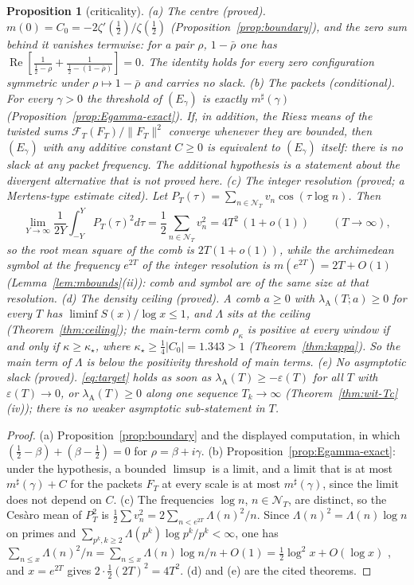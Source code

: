 \documentclass[11pt]{amsart}
\newtheorem{proposition}[theorem]{Proposition}
\theoremstyle{definition}
\theoremstyle{remark}
\newcommand{\Rel}{\operatorname{Re}}
\newcommand{\lamA}{\lambda_{\mathrm A}(T)}
\newcommand{\NT}{\mathcal N_T}
\begin{document}
\begin{proposition}[criticality]\label{prop:shape-crit}
\emph{(a) The centre (proved).} $m(0)=C_0=-2\zeta'(\frac12)/\zeta(\frac12)$ (Proposition~\ref{prop:boundary}), and the zero sum behind it
vanishes termwise: for a pair $\rho$, $1-\bar\rho$ one has $\Rel[\frac1{\frac12-\rho}+\frac1{\frac12-(1-\bar\rho)}]=0$. The identity holds
for every zero configuration symmetric under $\rho\mapsto1-\bar\rho$ and carries no slack.
\emph{(b) The packets (conditional).} For every $\gamma>0$ the threshold of $(E_\gamma)$ is exactly $m^\sharp(\gamma)$
(Proposition~\ref{prop:Egamma-exact}). If, in addition, the Riesz means of the twisted sums $\mathcal F_T(F_T)/\|F_T\|^2$ converge
whenever they are bounded, then $(E_\gamma)$ with any additive constant $C\ge0$ is equivalent to $(E_\gamma)$ itself: there is no slack at
any packet frequency. The additional hypothesis is a statement about the divergent alternative that is not proved here.
\emph{(c) The integer resolution (proved; a Mertens-type estimate cited).} Let $P_T(\tau)=\sum_{n\in\NT}v_n\cos(\tau\log n)$. Then
\[
\lim_{Y\to\infty}\frac1{2Y}\int_{-Y}^{Y}P_T(\tau)^2d\tau=\frac12\sum_{n\in\NT}v_n^2=4T^2\,(1+o(1))\qquad(T\to\infty),
\]
so the root mean square of the comb is $2T(1+o(1))$, while the archimedean symbol at the frequency $e^{2T}$ of the integer resolution is
$m(e^{2T})=2T+O(1)$ (Lemma~\ref{lem:mbounds}(ii)): comb and symbol are of the same size at that resolution.
\emph{(d) The density ceiling (proved).} A comb $a\ge0$ with $\lambda_{\mathrm A}(T;a)\ge0$ for every $T$ has
$\liminf S(x)/\log x\le1$, and $\Lambda$ sits at the ceiling (Theorem~\ref{thm:ceiling}); the main-term comb $\rho_\kappa$ is positive at
every window if and only if $\kappa\ge\kappa_\star$, where $\kappa_\star\ge\frac14|C_0|=1.343>1$ (Theorem~\ref{thm:kappa}). So the main
term of $\Lambda$ is below the positivity threshold of main terms.
\emph{(e) No asymptotic slack (proved).} \eqref{eq:target} holds as soon as $\lamA\ge-\varepsilon(T)$ for all $T$ with
$\varepsilon(T)\to0$, or $\lamA\ge0$ along one sequence $T_k\to\infty$ (Theorem~\ref{thm:wit-Tc}(iv)); there is no weaker asymptotic
sub-statement in $T$.
\end{proposition}
\begin{proof}
(a) Proposition~\ref{prop:boundary} and the displayed computation, in which $(\frac12-\beta)+(\beta-\frac12)=0$ for $\rho=\beta+i\gamma$.
(b) Proposition~\ref{prop:Egamma-exact}: under the hypothesis, a bounded $\limsup$ is a limit, and a limit that is at most
$m^\sharp(\gamma)+C$ for the packets $F_T$ at every scale is at most $m^\sharp(\gamma)$, since the limit does not depend on $C$.
(c) The frequencies $\log n$, $n\in\NT$, are distinct, so the Ces\`aro mean of $P_T^2$ is $\frac12\sum v_n^2=2\sum_{n<e^{2T}}\Lambda(n)^2/n$.
Since $\Lambda(n)^2=\Lambda(n)\log n$ on primes and $\sum_{p^k,k\ge2}\Lambda(p^k)\log p^k/p^k<\infty$, one has
$\sum_{n\le x}\Lambda(n)^2/n=\sum_{n\le x}\Lambda(n)\log n/n+O(1)=\frac12\log^2x+O(\log x)$ \cite[Thm.~2.7 and partial summation]{MontgomeryVaughan2007},
and $x=e^{2T}$ gives $2\cdot\frac12(2T)^2=4T^2$. (d) and (e) are the cited theorems.
\end{proof}
\end{document}
